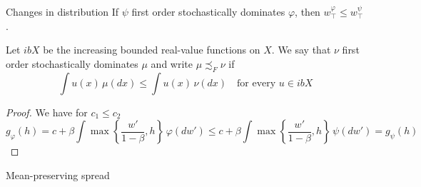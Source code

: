 \begin{frame}{Changes in distribution}
If $\psi$ first order stochastically dominates $\varphi$, then $w_\top^\varphi\le w_\top^\psi$.
\begin{definition}
    Let $ibX$ be the increasing bounded real-value functions on $X$. We say that $\nu$ first order stochastically dominates $\mu$ and write $\mu\precsim_F \nu$ if 
    $$
    \int u(x)\,\mu(dx)\le \int u(x)\,\nu(dx)\quad\text{for every $u\in ibX$}
    $$
\end{definition}
\begin{proof}
     We have for $c_1\le c_2$
    $$
    g_\varphi(h) = c + \beta \int \max\left\{\frac{w'}{1-\beta}, h\right\}\,\varphi(dw')\le c+ \beta \int \max\left\{\frac{w'}{1-\beta}, h\right\}\,\psi(dw') = g_\psi(h)
    $$
\end{proof}
    
\end{frame}


\begin{frame}{Mean-preserving spread}
    
\end{frame}